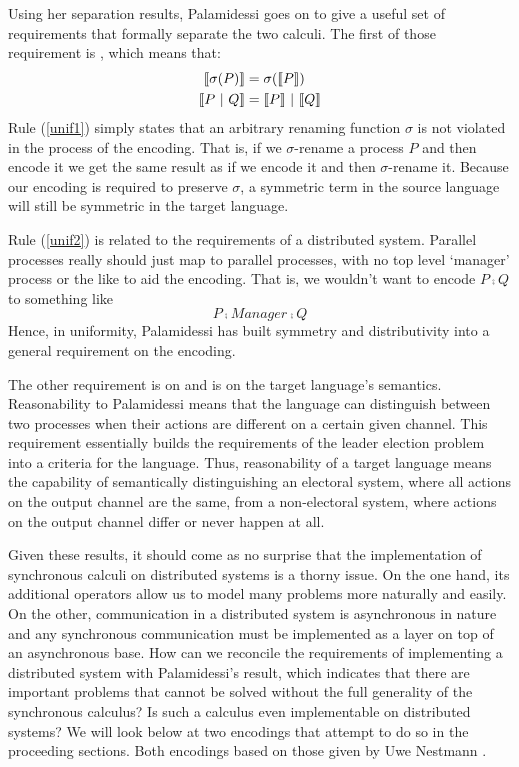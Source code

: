 Using her separation results, Palamidessi goes on to give a useful set of requirements that formally separate the two calculi.
The first of those requirement is , which means that:
\begin{align}
	\llbracket{\sigma(P)}\rrbracket &= \sigma(\llbracket{P}\rrbracket)\label{unif1}\\
	\llbracket{P \ensuremath{\ |\ } Q}\rrbracket &= \llbracket{P}\rrbracket \ |\  \llbracket{Q}\rrbracket\label{unif2}
\end{align}
Rule (\ref{unif1}) simply states that an arbitrary renaming function $\sigma$ is not violated in the process of the encoding.  
That is, if we $\sigma$-rename a process $P$ and then encode it we get the same result as if we encode it and then $\sigma$-rename it.  
Because our encoding is required to preserve $\sigma$, a symmetric term in the source language will still be symmetric in the target language.

Rule (\ref{unif2}) is related to the requirements of a distributed system.  
Parallel processes really should just map to parallel processes, with no top level `manager' process or the like to aid the encoding.
That is, we wouldn't want to encode $P \comp Q$ to something like 
\[
	P \comp Manager \comp Q
\]
Hence, in uniformity, Palamidessi has built symmetry and distributivity into a general requirement on the encoding.

The other requirement is on  and is on the target language's semantics.  
Reasonability to Palamidessi means that the language can distinguish between two processes when their actions are different on a certain given channel.  
This requirement essentially builds the requirements of the leader election problem into a criteria for the language.  
Thus, reasonability of a target language means the capability of semantically distinguishing an electoral system, where all actions on the output channel are the same, from a non-electoral system, where actions on the output channel differ or never happen at all.

Given these results, it should come as no surprise that the implementation of synchronous calculi on distributed systems is a thorny issue.  
On the one hand, its additional operators allow us to model many problems more naturally and easily.  
On the other, communication in a distributed system is asynchronous in nature and any synchronous communication must be implemented as a layer on top of an asynchronous base.  
How can we reconcile the requirements of implementing a distributed system with Palamidessi's result, which indicates that there are important problems that cannot be solved without the full generality of the synchronous calculus?  
Is such a calculus even implementable on distributed systems?
We will look below at two encodings that attempt to do so in the proceeding sections.  
Both encodings based on those given by Uwe Nestmann \cite{nestm00}.

